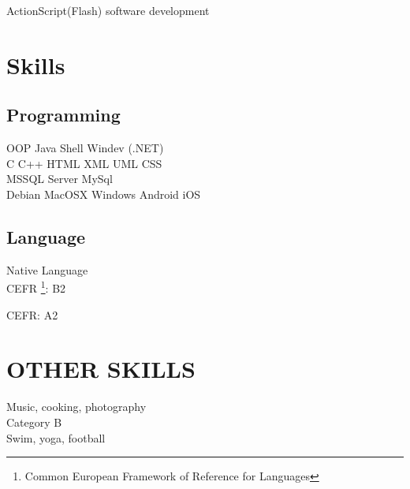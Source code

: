\documentclass[letterpaper]{deedy-resume} %
\begin{document}
\begin{minipage}[t]{0.66\textwidth}
\sectionspace %




\begin{tightitemize}
	\item  ActionScript(Flash) software development
\end{tightitemize}


\sectionspace %



\section{Skills}

\subsection{Programming}

OOP \textbullet{} Java \textbullet{} Shell \textbullet{} Windev (.NET) \\
C \textbullet{} C++ \textbullet{} HTML \textbullet{} XML \textbullet{} UML\textbullet{} CSS\\
MSSQL Server \textbullet{} MySql \\
Debian \textbullet{} MacOSX \textbullet{} Windows \textbullet{} Android \textbullet{} iOS

\sectionspace %

\subsection{Language}
Native Language \\
CEFR \footnote{Common European Framework of Reference for Languages}: B2 

CEFR: A2 


\section{OTHER SKILLS} 



Music, cooking, photography \\
Category B \\
Swim, yoga, football 


\end{minipage} %
\end{document}
